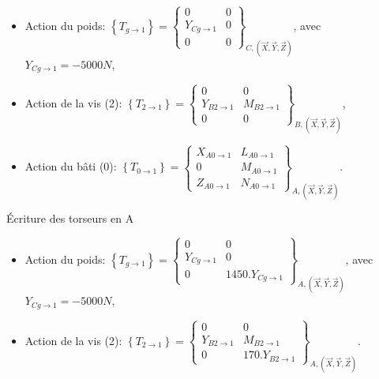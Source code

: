 \begin{itemize}
 \item Action du poids: $\left\{T_{g\rightarrow 1}\right\}=\left\{\begin{array}{cc}0 & 0 \\ Y_{Cg\rightarrow 1} & 0 \\ 0 & 0\end{array}\right\}_{C,(\overrightarrow{X},\overrightarrow{Y},\overrightarrow{Z})}$, avec $Y_{Cg\rightarrow 1}=-5000N$,
 \item Action de la vis (2): $\left\{T_{2\rightarrow 1}\right\}=\left\{\begin{array}{cc}0 & 0 \\ Y_{B2\rightarrow 1} & M_{B2\rightarrow 1} \\ 0 & 0\end{array}\right\}_{B,(\overrightarrow{X},\overrightarrow{Y},\overrightarrow{Z})}$,
  \item Action du bâti (0): $\left\{T_{0\rightarrow 1}\right\}=\left\{\begin{array}{cc}X_{A0\rightarrow 1} & L_{A0\rightarrow 1} \\ 0 & M_{A0\rightarrow 1} \\ Z_{A0\rightarrow 1} & N_{A0\rightarrow 1}\end{array}\right\}_{A	,(\overrightarrow{X},\overrightarrow{Y},\overrightarrow{Z})}$.
 \end{itemize}


Écriture des torseurs en A

\begin{itemize}
 \item Action du poids: $\left\{T_{g\rightarrow 1}\right\}=\left\{\begin{array}{cc}0 & 0 \\ Y_{Cg\rightarrow 1} & 0 \\ 0 & 1450.Y_{Cg\rightarrow 1}\end{array}\right\}_{A,(\overrightarrow{X},\overrightarrow{Y},\overrightarrow{Z})}$, avec $Y_{Cg\rightarrow 1}=-5000N$,
 \item Action de la vis (2): $\left\{T_{2\rightarrow 1}\right\}=\left\{\begin{array}{cc}0 & 0 \\ Y_{B2\rightarrow 1} & M_{B2\rightarrow 1} \\ 0 & 170.Y_{B2\rightarrow 1}\end{array}\right\}_{A,(\overrightarrow{X},\overrightarrow{Y},\overrightarrow{Z})}$.
 \end{itemize}

